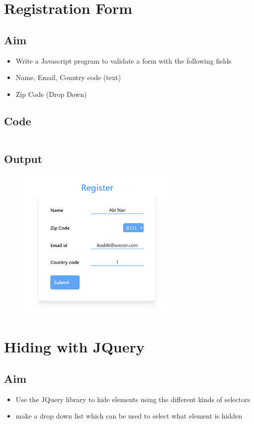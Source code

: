 \documentclass{article}
\begin{document}
\section{Registration Form}
\subsection{Aim}
\begin{itemize}
  \item Write a Javascript program to validate a form with the following fields
  \item Name, Email, Country code (text)
  \item Zip Code (Drop Down)
\end{itemize}

\subsection{Code}
\inputminted[frame=lines, breaklines, breakanywhere, numberblanklines=false]{html}{./prog_17/index.html}

\subsection{Output}
\begin{figure}[h!]
	\centering
	\includegraphics[width=0.7\textwidth]{./Assets/p17.png}
\end{figure}
\newpage

\section{Hiding with JQuery}
\subsection{Aim}
\begin{itemize}
  \item Use the JQuery library to hide elements using the different kinds of selectors
  \item make a drop down list which can be used to select what element is hidden
\end{itemize}
\end{document}
